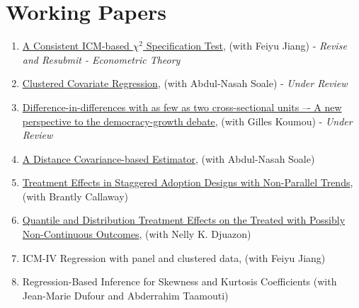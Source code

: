 \documentclass[12pt,letterpaper]{article}
\begin{document}
\section*{Working Papers}
\begin{enumerate}
    \item \href{https://arxiv.org/pdf/2208.13370.pdf}{A Consistent ICM-based $\chi^2$ Specification Test}, (with Feiyu Jiang) - \textit{Revise and Resubmit - Econometric Theory}
    
    \item \href{https://arxiv.org/pdf/2302.09255.pdf}{Clustered Covariate Regression}, (with Abdul-Nasah Soale) - \textit{Under Review}
    
  \item \href{https://arxiv.org/pdf/2408.13047}{Difference-in-differences with as few as two cross-sectional units –- A new perspective to the democracy-growth debate}, (with Gilles Koumou) - \textit{Under Review}
  
  \item \href{https://arxiv.org/pdf/2102.07008.pdf}{A Distance Covariance-based Estimator}, (with Abdul-Nasah Soale)
  
  \item \href{https://arxiv.org/pdf/2308.02899.pdf}{Treatment Effects in Staggered Adoption Designs with Non-Parallel Trends}, (with Brantly Callaway)
  
  \item \href{https://arxiv.org/pdf/2408.07842}{Quantile and Distribution Treatment Effects on the Treated with Possibly Non-Continuous Outcomes}, (with Nelly K. Djuazon)
	
	\item ICM-IV Regression with panel and clustered data, (with Feiyu Jiang) %

\item Regression-Based Inference for Skewness and Kurtosis Coefficients (with Jean-Marie Dufour and Abderrahim Taamouti)
	
	
\end{enumerate}
\end{document}
